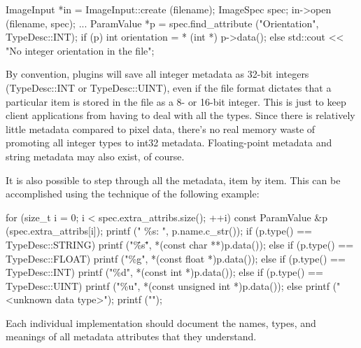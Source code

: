 \begin{code}
        ImageInput *in = ImageInput::create (filename);
        ImageSpec spec;
        in->open (filename, spec);
        ...
        ParamValue *p = spec.find_attribute ("Orientation", TypeDesc::INT);
        if (p) {
            int orientation = * (int *) p->data();
        } else {
            std::cout << "No integer orientation in the file\n";
        }
\end{code}

By convention, \ImageInput plugins will save all integer metadata as
32-bit integers ({\cf TypeDesc::INT} or {\cf TypeDesc::UINT}), even if the file format
dictates that a particular item is stored in the file as a 8- or 16-bit
integer.  This is just to keep client applications from having to deal
with all the types.  Since there is relatively little metadata compared
to pixel data, there's no real memory waste of promoting all integer
types to int32 metadata.  Floating-point metadata and string metadata
may also exist, of course.

It is also possible to step through all the metadata, item by item.
This can be accomplished using the technique of the following example:

\begin{code}
        for (size_t i = 0;  i < spec.extra_attribs.size();  ++i) {
            const ParamValue &p (spec.extra_attribs[i]);
            printf ("    \%s: ", p.name.c_str());
            if (p.type() == TypeDesc::STRING)
                printf ("\"\%s\"", *(const char **)p.data());
            else if (p.type() == TypeDesc::FLOAT)
                printf ("\%g", *(const float *)p.data());
            else if (p.type() == TypeDesc::INT)
                printf ("\%d", *(const int *)p.data());
            else if (p.type() == TypeDesc::UINT)
                printf ("\%u", *(const unsigned int *)p.data());
            else
                printf ("<unknown data type>");
            printf ("\n");
        }
\end{code}

Each individual \ImageInput implementation should document the names,
types, and meanings of all metadata attributes that they understand.


%


